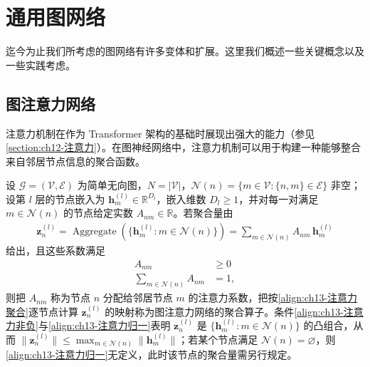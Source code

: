 \documentclass[../../main.tex]{subfiles}
\begin{document}
\section{通用图网络}\label{section:ch13-通用图网络}

迄今为止我们所考虑的图网络有许多变体和扩展。这里我们概述一些关键概念以及一些实践考虑。

\subsection{图注意力网络}\label{subsection:ch13-图注意力网络}

注意力机制在作为 Transformer 架构的基础时展现出强大的能力（参见\cref{section:ch12-注意力}）。在图神经网络中，注意力机制可以用于构建一种能够整合来自邻居节点信息的聚合函数。

\begin{definition}[图注意力网络]\label{definition:ch13-图注意力网络}
设 $\mathcal{G}=(\mathcal{V},\mathcal{E})$ 为简单无向图，$N=|\mathcal{V}|$，$\mathcal{N}(n)=\{m\in\mathcal{V}:\{n,m\}\in\mathcal{E}\}$ 非空；设第 $l$ 层的节点嵌入为 $\bm{h}_m^{(l)}\in\mathbb{R}^{D_l}$，嵌入维数 $D_l\geqslant1$，并对每一对满足 $m\in\mathcal{N}(n)$ 的节点给定实数 $A_{nm}\in\mathbb{R}$。若聚合量由
\begin{align}
\bm{z}_n^{(l)}=\operatorname{Aggregate}\!\left(\{\bm{h}_m^{(l)}:m\in\mathcal{N}(n)\}\right)=\sum_{m\in\mathcal{N}(n)}A_{nm}\,\bm{h}_m^{(l)}
\label{align:ch13-注意力聚合}
\end{align}
给出，且这些系数满足
\begin{align}
A_{nm}&\geqslant 0
\label{align:ch13-注意力非负}\\
\sum_{m\in\mathcal{N}(n)}A_{nm}&=1,
\label{align:ch13-注意力归一}
\end{align}
则把 $A_{nm}$ 称为节点 $n$ 分配给邻居节点 $m$ 的注意力系数，把按\eqref{align:ch13-注意力聚合}逐节点计算 $\bm{z}_n^{(l)}$ 的映射称为图注意力网络的聚合算子。条件\eqref{align:ch13-注意力非负}与\eqref{align:ch13-注意力归一}表明 $\bm{z}_n^{(l)}$ 是 $\{\bm{h}_m^{(l)}:m\in\mathcal{N}(n)\}$ 的凸组合，从而 $\|\bm{z}_n^{(l)}\|\leqslant\max_{m\in\mathcal{N}(n)}\|\bm{h}_m^{(l)}\|$；若某个节点满足 $\mathcal{N}(n)=\varnothing$，则\eqref{align:ch13-注意力归一}无定义，此时该节点的聚合量需另行规定。
\end{definition}
\end{document}
